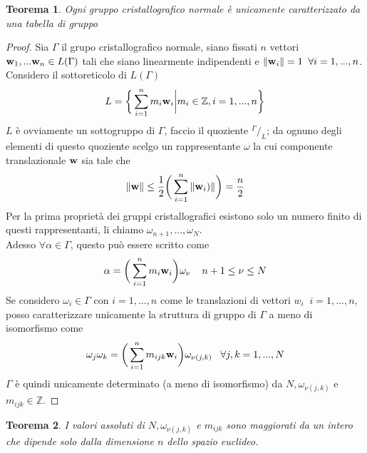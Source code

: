 \documentclass[12pt,a4paper]{book}
\newtheorem{theorem}{Teorema}[section]
\newcommand*\quot[2]{{^{\textstyle #1}\big/_{\textstyle #2}}}
\begin{document}
\begin{theorem}
Ogni gruppo cristallografico normale è unicamente caratterizzato da una tabella di gruppo 
\end{theorem}

\begin{proof}
Sia $\Gamma$ il grupo cristallografico normale, siano fissati $n$ vettori $\vb{w}_1, ... \vb{w}_n \in L(\Gamma) $ tali che siano linearmente indipendenti e $\norm{\vb{w}_i} = 1  \; \; \forall i = 1, ..., n$.  \\
Considero il sottoreticolo  di $L(\Gamma)$
\[ L = \bigg\{ \sum_{i = 1}^{n} m_i \vb{w}_i \bigg| m_i \in \mathbb{Z}, i = 1, ..., n \bigg\} \]
$L$ è ovviamente un sottogruppo di $\Gamma$, faccio il quoziente $\quot{\Gamma}{L} $; da ognuno degli elementi di questo quoziente scelgo un rappresentante $\omega$ la cui componente translazionale $\vb{w} $ sia tale che 
\[ \norm{\vb{w}} \leq \frac{1}{2} \bigg( \sum_{i = 1}^{n} \norm{ \vb{w}_i)} \bigg) = \frac{n}{2}\]  
Per la prima proprietà dei gruppi cristallografici esistono solo un numero finito di questi rappresentanti, li chiamo $\omega_{n+1}, ... , \omega_N$. \\
Adesso $\forall \alpha \in \Gamma$, questo può essere scritto come 
\[ \alpha = \bigg( \sum_{i = 1}^{n} m_i \vb{w}_i \bigg) \omega_{\nu} \; \; \; \; n+1 \leq \nu \leq N\]
Se considero $\omega_i \in \Gamma$ con $i=1, ...,n$ come le translazioni di vettori $w_i \; \; i=1, ...,n$, posso caratterizzare unicamente la struttura di gruppo di $\Gamma$ a meno di isomorfismo come 
\begin{equation}
	 \omega_j \omega_k = \bigg( \sum_{i = 1}^{n} m_{ijk} \vb{w}_i\bigg) \omega_{\nu (j,k)}      \; \; \; \forall j,k =1, ...,N 
\end{equation}
$\Gamma$  è quindi unicamente determinato (a meno di isomorfismo) da $N, \omega_{\nu (j,k)}$ e $m_{ijk} \in \mathbb{Z}$.

\end{proof}

\begin{theorem}
I valori assoluti di $N, \omega_{\nu (j,k)}$ e $m_{ijk}$ sono maggiorati da un intero che dipende solo dalla dimensione $n$ dello spazio euclideo.
\end{theorem}
	
\end{document}
